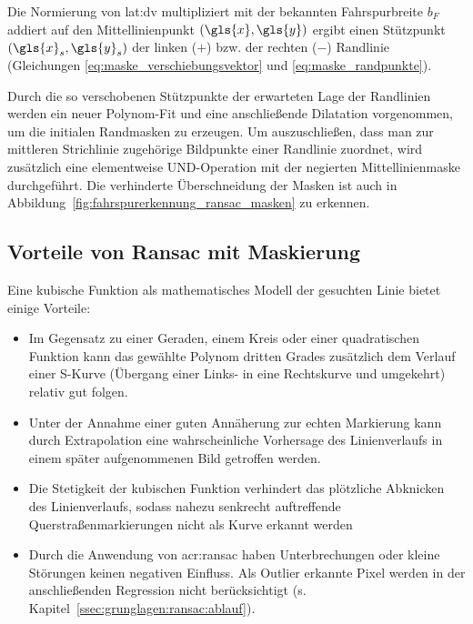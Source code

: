 Die Normierung von \gls{lat:dv} multipliziert mit der bekannten Fahrspurbreite \( b_F \) addiert auf den Mittellinienpunkt \( (\gls{x},\gls{y}) \) ergibt einen Stützpunkt \( ({\gls{x}}_s,{\gls{y}}_s) \) der linken (\( + \)) bzw. der rechten (\( - \)) Randlinie (Gleichungen \eqref{eq:maske_verschiebungsvektor} und \eqref{eq:maske_randpunkte}).

Durch die so verschobenen Stützpunkte der erwarteten Lage der Randlinien werden ein neuer Polynom-Fit und eine anschließende Dilatation vorgenommen, um die initialen Randmasken zu erzeugen. Um auszuschließen, dass man zur mittleren Strichlinie zugehörige Bildpunkte einer Randlinie zuordnet, wird zusätzlich eine elementweise UND-Operation mit der negierten Mittellinienmaske durchgeführt. Die verhinderte Überschneidung der Masken ist auch in Abbildung~\ref{fig:fahrspurerkennung_ransac_masken} zu erkennen.


\subsection{Vorteile von Ransac mit Maskierung}

Eine kubische Funktion als mathematisches Modell der gesuchten Linie bietet einige Vorteile:
\begin{itemize}
\item Im Gegensatz zu einer Geraden, einem Kreis oder einer quadratischen Funktion kann das gewählte Polynom dritten Grades zusätzlich dem Verlauf einer S-Kurve (Übergang einer Links- in eine Rechtskurve und umgekehrt) relativ gut folgen. 
\item Unter der Annahme einer guten Annäherung zur echten Markierung kann durch Extrapolation eine wahrscheinliche Vorhersage des Linienverlaufs in einem später aufgenommenen Bild getroffen werden. 
\item Die Stetigkeit der kubischen Funktion verhindert das plötzliche Abknicken des Linienverlaufs, sodass nahezu senkrecht auftreffende Querstraßenmarkierungen nicht als Kurve erkannt werden
\item Durch die Anwendung von \gls{acr:ransac} haben Unterbrechungen oder kleine Störungen keinen negativen Einfluss. Als Outlier erkannte Pixel werden in der anschließenden Regression nicht berücksichtigt (s. Kapitel~\ref{ssec:grunglagen:ransac:ablauf}).
\end{itemize}

